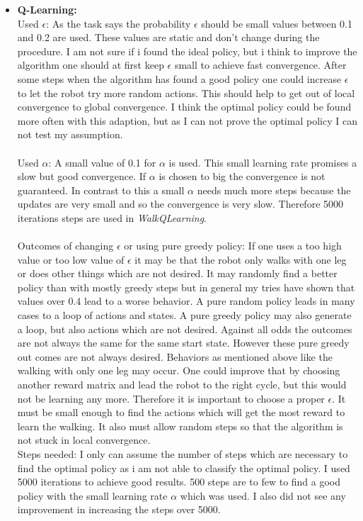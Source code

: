 \documentclass[conference]{IEEEtran}
\begin{document}
\begin{itemize}
\item \textbf{Q-Learning:}\\
Used $\epsilon$: As the task says the probability $\epsilon$ should be small values between 0.1 and 0.2 are used. These values are static and don't change during the procedure. I am not sure if i found the ideal policy, but i think to improve the algorithm one should at first keep $\epsilon$ small to achieve fast convergence. After some steps when the algorithm has found a good policy one could increase $\epsilon$ to let the robot try more random actions. This should help to get out of local convergence to global convergence. I think the optimal policy could be found more often with this adaption, but as I can not prove the optimal policy I can not test my assumption.\\
\\
Used $\alpha$: A small value of 0.1 for $\alpha$ is used. This small learning rate promises a slow but good convergence. If $\alpha$ is chosen to big the convergence is not guaranteed. In contrast to this a small $\alpha$ needs much more steps because the updates are very small and so the convergence is very slow. Therefore 5000 iterations steps are used in \textit{WalkQLearning}. \\
\\
Outcomes of changing $\epsilon$ or using pure greedy policy: If one uses a too high value or too low value of $\epsilon$ it may be that the robot only walks with one leg or does other things which are not desired. It may randomly find a better policy than with mostly greedy steps but in general my tries have shown that values over 0.4 lead to a worse behavior. A pure random policy leads in many cases to a loop of actions and states. A pure greedy policy may also generate a loop, but also actions which are not desired. Against all odds the outcomes are not always the same for the same start state. However these pure greedy out comes are not always desired. Behaviors as mentioned above like the walking with only one leg may occur. One could improve that by choosing another reward matrix and lead the robot to the right cycle, but this would not be learning any more. Therefore it is important to choose a proper $\epsilon$. It must be small enough to find the actions which will get the most reward to learn the walking. It also must allow random steps so that the algorithm is not stuck in local convergence.\\

Steps needed: I only can assume the number of steps which are necessary to find the optimal policy as i am not able to classify the optimal policy. I used 5000 iterations to achieve good results. 500 steps are to few to find a good policy with the small learning rate $\alpha$ which was used. I also did not see any improvement in increasing the steps over 5000. \\


\end{itemize}
\end{document}
